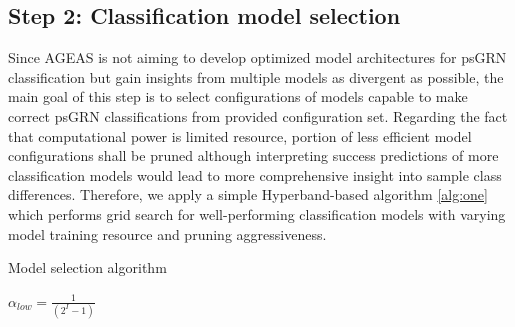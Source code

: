 \documentclass[fleqn,10pt]{wlscirep}
\begin{document}
  \subsection*{Step 2: Classification model selection}
    \label{step2}
    Since AGEAS is not aiming to develop optimized model architectures for psGRN classification but gain insights from multiple models as divergent as possible, the main goal of this step is to select configurations of models capable to make correct psGRN classifications from provided configuration set.
    Regarding the fact that computational power is limited resource, portion of less efficient model configurations shall be pruned although interpreting success predictions of more classification models would lead to more comprehensive insight into sample class differences.
    Therefore, we apply a simple Hyperband\cite{hyperband}-based algorithm \ref{alg:one} which performs grid search for well-performing classification models with varying model training resource and pruning aggressiveness.


    \begin{algorithm}
    \caption{Model selection algorithm}
    \label{alg:one}
    $\alpha_{low} = \frac{1}{(2 ^ {I} - 1)}$\;
    \end{algorithm}
\end{document}
